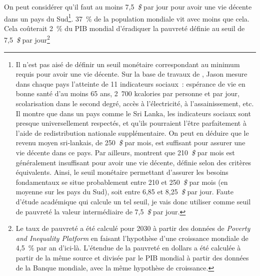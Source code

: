 \documentclass[a5paper,french,openany]{memoir}
\begin{document}
On peut considérer qu'il faut au moins 7,5~\textit{\$} par jour pour avoir une vie décente dans un pays du Sud\footnote{Il n'est pas aisé %
de définir un seuil monétaire correspondant au minimum requis pour avoir une vie décente. Sur la base de travaux de \cite{oneill_good_2018}, Jason \cite{hickel_is_2019} mesure dans chaque pays l'atteinte de 11 indicateurs sociaux~: espérance de vie en bonne santé d'au moins 65 ans, 2~700 kcalories par personne et par jour, scolarisation dans le second degré, accès à l'électricité, à l'assainissement, etc. Il montre que dans un pays comme le Sri Lanka, les indicateurs sociaux sont presque universellement respectés, et qu'ils pourraient l'être parfaitement à l'aide de redistribution nationale supplémentaire. On peut en déduire que le revenu moyen sri-lankais, de 250~\textit{\$} %
par mois, %
est suffisant pour assurer une vie décente dans ce pays. Par ailleurs, \cite{kikstra_decent_2021} montrent que 210~\textit{\$} par mois %
est généralement insuffisant pour avoir une vie décente, définie selon des critères équivalents. Ainsi, le seuil monétaire permettant d'assurer les besoins fondamentaux se situe probablement entre 210 et 250~\textit{\$} par mois (en moyenne sur les pays du Sud), soit entre 6,85 et 8,25~\textit{\$} par jour. Faute d'étude académique qui calcule un tel seuil, je vais donc utiliser comme seuil de pauvreté la valeur intermédiaire de 7,5~\textit{\$} par jour.}. 
37~\% de la population mondiale vit avec moins que cela. %
Cela coûterait 2~\% %
du PIB mondial d'éradiquer la pauvreté définie au seuil de 7,5~\textit{\$} par jour\footnote{Le taux de pauvreté a été calculé pour 2030 à partir des données de \textit{Poverty and Inequality Platform} en faisant l'hypothèse d'une croissance mondiale de 4,5~\% par an d'ici-là. L'étendue de la pauvreté en dollars a été calculée à partir de la même source et divisée par le PIB mondial à partir des données de la Banque mondiale, avec la même hypothèse de croissance.}%
\end{document}
